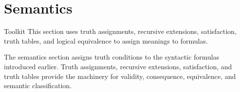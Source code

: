 \section{Semantics}

\begin{toolkitbox}{Toolkit}
This section uses truth assignments, recursive extensions, satisfaction,
truth tables, and logical equivalence to assign meanings to formulas.
\end{toolkitbox}

\begin{remark*}[Exposition]
The semantics section assigns truth conditions to the syntactic formulas
introduced earlier. Truth assignments, recursive extensions, satisfaction,
and truth tables provide the machinery for validity, consequence, equivalence,
and semantic classification.
\end{remark*}


